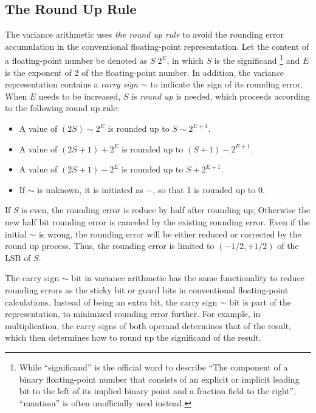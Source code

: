 \documentclass[twoside]{article}
\numberwithin{equation}{section}
\begin{document}
\subsection{The Round Up Rule}

The variance arithmetic uses \emph{the round up rule} to avoid the rounding error accumulation in the conventional floating-point representation.
Let the content of a floating-point number be denoted as $S\; 2^E$, in which $S$ is the significand \footnote{While ``significand'' is the official word \cite{Floating_Point_Standard} to describe ``The component of a binary floating-point number that consists of an explicit or implicit leading bit to the left of its implied binary point and a fraction field to the right'', ``mantissa'' is often unofficially used instead.} and $E$ is the exponent of 2 of the floating-point number.  
In addition, the variance representation contains a \emph{carry sign} $\sim$  to indicate the sign of its rounding error.
When $E$ needs to be increased, $S$ is \emph{round up} is needed, which proceeds according to the following round up rule:
\begin{itemize}
\item A value of $(2S) \sim 2^E$ is rounded up to $S \sim 2^{E+1}$.  

\item A value of $(2S+1)\!+\!2^E$ is rounded up to $(S+1)\!-\!2^{E+1}$.
  
\item A value of $(2S+1)\!-\!2^E$ is rounded up to $S\!+\!2^{E+1}$.

\item If $\sim$ is unknown, it is initiated as $-$, so that 1 is rounded up to 0.
\end{itemize}

If $S$ is even, the rounding error is reduce by half after rounding up; Otherwise the new half bit rounding error is canceled by the existing rounding error.
Even if the initial $\sim$ is wrong, the rounding error will be either reduced or corrected by the round up process. 
Thus, the rounding error is limited to $(-1/2, +1/2)$ of the LSB of $S$.

The carry sign $\sim$ bit in variance arithmetic has the same functionality to reduce rounding errors as the sticky bit or guard bits in conventional floating-point calculations.
Instead of being an extra bit, the carry sign $\sim$ bit is part of the representation, to minimized rounding error further.
For example, in multiplication, the carry signs of both operand determines that of the result, which then determines how to round up the significand of the result. 
\end{document}
